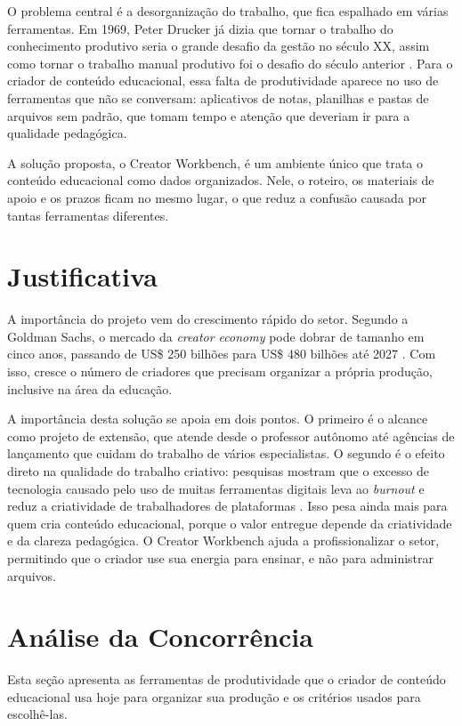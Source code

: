 O problema central é a desorganização do trabalho, que fica espalhado em várias ferramentas. Em 1969, Peter Drucker já dizia que tornar o trabalho do conhecimento produtivo seria o grande desafio da gestão no século XX, assim como tornar o trabalho manual produtivo foi o desafio do século anterior \cite{drucker1999}. Para o criador de conteúdo educacional, essa falta de produtividade aparece no uso de ferramentas que não se conversam: aplicativos de notas, planilhas e pastas de arquivos sem padrão, que tomam tempo e atenção que deveriam ir para a qualidade pedagógica.

A solução proposta, o Creator Workbench, é um ambiente único que trata o conteúdo educacional como dados organizados. Nele, o roteiro, os materiais de apoio e os prazos ficam no mesmo lugar, o que reduz a confusão causada por tantas ferramentas diferentes.

\section{Justificativa}

A importância do projeto vem do crescimento rápido do setor. Segundo a Goldman Sachs, o mercado da \textit{creator economy} pode dobrar de tamanho em cinco anos, passando de US\$ 250 bilhões para US\$ 480 bilhões até 2027 \cite{goldman2023creator}. Com isso, cresce o número de criadores que precisam organizar a própria produção, inclusive na área da educação.

A importância desta solução se apoia em dois pontos. O primeiro é o alcance como projeto de extensão, que atende desde o professor autônomo até agências de lançamento que cuidam do trabalho de vários especialistas. O segundo é o efeito direto na qualidade do trabalho criativo: pesquisas mostram que o excesso de tecnologia causado pelo uso de muitas ferramentas digitais leva ao \textit{burnout} e reduz a criatividade de trabalhadores de plataformas \cite{bunjak2021}. Isso pesa ainda mais para quem cria conteúdo educacional, porque o valor entregue depende da criatividade e da clareza pedagógica. O Creator Workbench ajuda a profissionalizar o setor, permitindo que o criador use sua energia para ensinar, e não para administrar arquivos.

\section{Análise da Concorrência}

Esta seção apresenta as ferramentas de produtividade que o criador de conteúdo educacional usa hoje para organizar sua produção e os critérios usados para escolhê-las.

